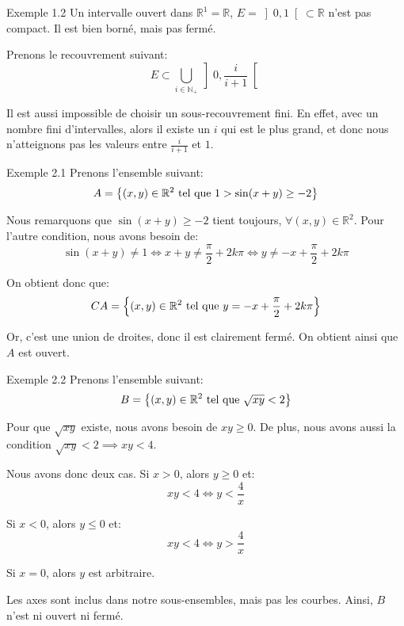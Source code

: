 \documentclass[a4paper]{article}
\begin{document}
\begin{parag}{Exemple 1.2}
    Un intervalle ouvert dans $\mathbb{R}^1 = \mathbb{R}$, $E = \left]0, 1\right[ \subset \mathbb{R}$ n'est pas compact. Il est bien borné, mais pas fermé.

    Prenons le recouvrement suivant: 
    \[E \subset \bigcup_{i \in \mathbb{N}_+} \left]0, \frac{i}{i+1}\right[ \]
    

    Il est aussi impossible de choisir un sous-recouvrement fini. En effet, avec un nombre fini d'intervalles, alors il existe un $i$ qui est le plus grand, et donc nous n'atteignons pas les valeurs entre $\frac{i}{i+1}$ et $1$.
\end{parag}

\begin{parag}{Exemple 2.1}
    Prenons l'ensemble suivant: 
    \[A = \left\{\left(x, y\right) \in \mathbb{R}^2 \telque 1 > \sin\left(x + y\right) \geq -2\right\}\]

    Nous remarquons que $\sin\left(x + y\right) \geq -2$ tient toujours, $\forall \left(x, y\right) \in \mathbb{R}^2$. Pour l'autre condition, nous avons besoin de: 
    \[\sin\left(x + y\right) \neq 1 \iff x + y \neq \frac{\pi}{2} + 2k\pi \iff y \neq -x + \frac{\pi}{2} + 2k\pi\]
    
    On obtient donc que: 
    \[CA = \left\{\left(x, y\right) \in \mathbb{R}^2 \telque y = -x + \frac{\pi}{2} + 2k\pi\right\}\]
    
    Or, c'est une union de droites, donc il est clairement fermé. On obtient ainsi que $A$ est ouvert.

\end{parag}

\begin{parag}{Exemple 2.2}
    Prenons l'ensemble suivant: 
    \[B = \left\{\left(x, y\right)\in \mathbb{R}^2 \telque \sqrt{xy} < 2\right\}\]
    
    Pour que $\sqrt{xy}$ existe, nous avons besoin de $xy \geq 0$. De plus, nous avons aussi la condition $\sqrt{xy} < 2 \implies xy < 4$.

    Nous avons donc deux cas. Si $x > 0$, alors $y \geq 0$ et: 
    \[xy < 4 \iff y < \frac{4}{x}\]
    
    Si $x < 0$, alors $y \leq 0$ et: 
    \[xy < 4 \iff y > \frac{4}{x}\]
    
    Si $x = 0$, alors $y$ est arbitraire.


    Les axes sont inclus dans notre sous-ensembles, mais pas les courbes. Ainsi, $B$ n'est ni ouvert ni fermé.
\end{parag}
\end{document}
